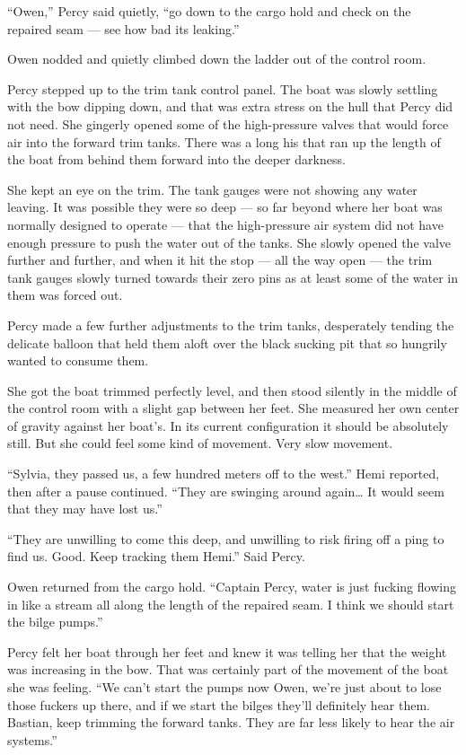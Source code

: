\documentclass[]{scrbook}
\begin{document}
``Owen,'' Percy said quietly, ``go down to the cargo hold and check on
the repaired seam --- see how bad its leaking.''

Owen nodded and quietly climbed down the ladder out of the control room.

Percy stepped up to the trim tank control panel. The boat was slowly
settling with the bow dipping down, and that was extra stress on the
hull that Percy did not need. She gingerly opened some of the
high-pressure valves that would force air into the forward trim tanks.
There was a long his that ran up the length of the boat from behind them
forward into the deeper darkness.

She kept an eye on the trim. The tank gauges were not showing any water
leaving. It was possible they were so deep --- so far beyond where her
boat was normally designed to operate --- that the high-pressure air
system did not have enough pressure to push the water out of the tanks.
She slowly opened the valve further and further, and when it hit the
stop --- all the way open --- the trim tank gauges slowly turned towards
their zero pins as at least some of the water in them was forced out.

Percy made a few further adjustments to the trim tanks, desperately
tending the delicate balloon that held them aloft over the black sucking
pit that so hungrily wanted to consume them.

She got the boat trimmed perfectly level, and then stood silently in the
middle of the control room with a slight gap between her feet. She
measured her own center of gravity against her boat's. In its current
configuration it should be absolutely still. But she could feel some
kind of movement. Very slow movement.

``Sylvia, they passed us, a few hundred meters off to the west.'' Hemi
reported, then after a pause continued. ``They are swinging around
again\ldots{} It would seem that they may have lost us.''

``They are unwilling to come this deep, and unwilling to risk firing off
a ping to find us. Good. Keep tracking them Hemi.'' Said Percy.

Owen returned from the cargo hold. ``Captain Percy, water is just
fucking flowing in like a stream all along the length of the repaired
seam. I think we should start the bilge pumps.''

Percy felt her boat through her feet and knew it was telling her that
the weight was increasing in the bow. That was certainly part of the
movement of the boat she was feeling. ``We can't start the pumps now
Owen, we're just about to lose those fuckers up there, and if we start
the bilges they'll definitely hear them. Bastian, keep trimming the
forward tanks. They are far less likely to hear the air systems.''
\end{document}
